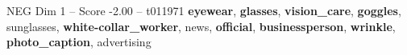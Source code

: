 \begin{textsample}{NEG Dim 1 – Score -2.00 – t011971}  \label{ex:f1_neg_021}
\textbf{eyewear}, \textbf{glasses}, \textbf{vision\_care}, \textbf{goggles}, sunglasses, \textbf{white-collar\_worker}, news, \textbf{official}, \textbf{businessperson}, \textbf{wrinkle}, \textbf{photo\_caption}, advertising

\end{textsample}
